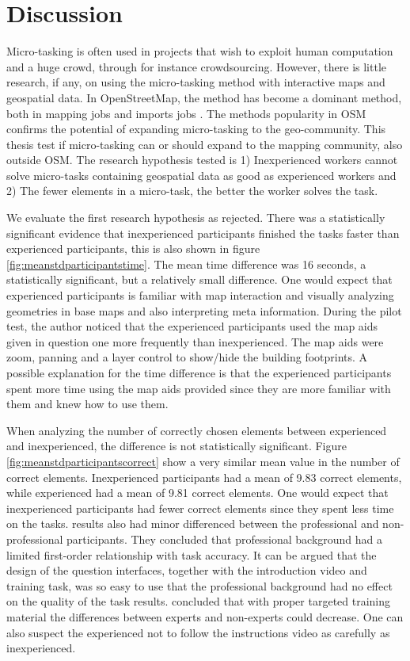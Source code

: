 \chapter{Discussion}
Micro-tasking is often used  in projects that wish to exploit human computation and a huge crowd, through for instance crowdsourcing. However, there is little research, if any, on using the micro-tasking method with interactive maps and geospatial data. In OpenStreetMap, the method has become a dominant method, both in mapping jobs and imports jobs \citep{Erichsen2016}. The methods popularity in OSM confirms the potential of expanding micro-tasking to the geo-community. This thesis test if micro-tasking can or should expand to the mapping community, also outside OSM. The research hypothesis tested is 1) Inexperienced workers cannot solve micro-tasks containing geospatial data as good as experienced workers and 2) The fewer elements in a micro-task, the better the worker solves the task.  

We evaluate the first research hypothesis as rejected. There was a statistically significant evidence that inexperienced participants finished the tasks faster than experienced participants, this is also shown in figure \ref{fig:meanstdparticipantstime}. The mean time difference was 16 seconds, a statistically significant, but a relatively small difference. One would expect that experienced participants is familiar with map interaction and visually analyzing geometries in base maps and also interpreting meta information. During the pilot test, the author noticed that the experienced participants used the map aids given in question one more frequently than inexperienced. The map aids were zoom, panning and a layer control to show/hide the building footprints. A possible explanation for the time difference is that the experienced participants spent more time using the map aids provided since they are more familiar with them and knew how to use them.

When analyzing the number of correctly chosen elements between experienced and inexperienced, the difference is not statistically significant. Figure \ref{fig:meanstdparticipantscorrect} show a very similar mean value in the number of correct elements. Inexperienced participants had a mean of 9.83 correct elements, while experienced had a mean of 9.81 correct elements. One would expect that inexperienced participants had fewer correct elements since they spent less time on the tasks. \cite{Salk2016} results also had minor differenced between the professional and non-professional participants. They concluded that professional background had a limited first-order relationship with task accuracy. It can be argued that the design of the question interfaces, together with the introduction video and training task, was so easy to use that the professional background had no effect on the quality of the task results. \cite{See2013} concluded that with proper targeted training material the differences between experts and non-experts could decrease. One can also suspect the experienced not to follow the instructions video as carefully as inexperienced. 

